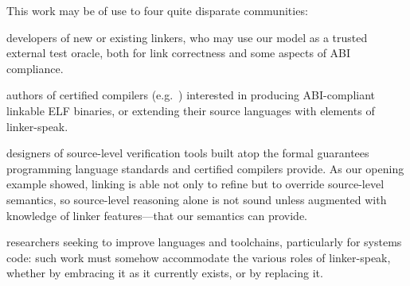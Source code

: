 This work may be of use to four quite disparate communities:
\begin{verytightitemize}
\item developers of new or existing linkers, who may use our model as a trusted external test oracle, both for link correctness and some aspects of ABI compliance.
\item authors of certified compilers (e.g.~\cite{amadio-certified-2014, kumar-cake-2014, leroy-formal-2009, sevcik-compcert-2013}) interested in producing ABI-compliant linkable ELF binaries, or extending their source languages with elements of linker-speak. 

\item designers of source-level verification tools built atop the formal
guarantees programming language standards and certified compilers
provide. %
As our opening example showed, linking is able not only to refine but to override source-level semantics, so source-level reasoning alone is not sound unless augmented with knowledge of linker features---that our semantics can provide.

\item researchers seeking to improve languages and toolchains, particularly for systems code: such work must somehow accommodate the various roles of linker-speak, whether by embracing it as it currently exists, or by replacing it.
\end{verytightitemize}
